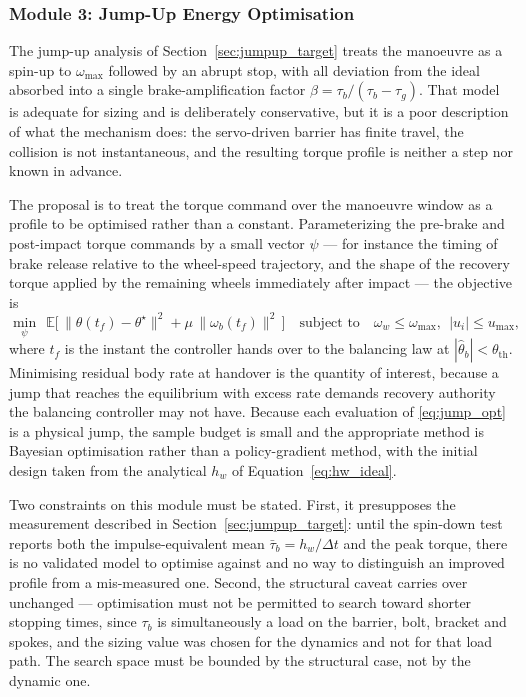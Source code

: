 \subsubsection{Module 3: Jump-Up Energy Optimisation}

The jump-up analysis of Section~\ref{sec:jumpup_target} treats the manoeuvre as
a spin-up to $\omega_{\max}$ followed by an abrupt stop, with all deviation
from the ideal absorbed into a single brake-amplification factor
$\beta = \tau_b/(\tau_b-\tau_g)$. That model is adequate for sizing and is
deliberately conservative, but it is a poor description of what the mechanism
does: the servo-driven barrier has finite travel, the collision is not
instantaneous, and the resulting torque profile is neither a step nor known in
advance.

The proposal is to treat the torque command over the manoeuvre window as a
profile to be optimised rather than a constant. Parameterizing the
pre-brake and post-impact torque commands by a small vector $\psi$ --- for
instance the timing of brake release relative to the wheel-speed trajectory,
and the shape of the recovery torque applied by the remaining wheels
immediately after impact --- the objective is
\begin{equation}
\min_{\psi}\ \ \mathbb{E}\Big[\, \|\theta(t_f) - \theta^\star\|^2 + \mu\,\|\omega_b(t_f)\|^2 \,\Big]
\quad \text{subject to} \quad
\omega_w \le \omega_{\max},\ \ |u_i| \le u_{\max},
\label{eq:jump_opt}
\end{equation}
where $t_f$ is the instant the controller hands over to the balancing law at
$|\hat\theta_b| < \theta_{\text{th}}$. Minimising residual body rate at
handover is the quantity of interest, because a jump that reaches the
equilibrium with excess rate demands recovery authority the balancing
controller may not have. Because each evaluation of \eqref{eq:jump_opt} is a
physical jump, the sample budget is small and the appropriate method is
Bayesian optimisation rather than a policy-gradient method, with the initial
design taken from the analytical $h_w$ of Equation~\eqref{eq:hw_ideal}.

Two constraints on this module must be stated. First, it presupposes the
measurement described in Section~\ref{sec:jumpup_target}: until the spin-down test
reports both the impulse-equivalent mean
$\bar\tau_b = h_w/\Delta t$ and the peak torque, there is no validated model to
optimise against and no way to distinguish an improved profile from a
mis-measured one. Second, the structural caveat carries over unchanged ---
optimisation must not be permitted to search toward shorter stopping times,
since $\tau_b$ is simultaneously a load on the barrier, bolt, bracket and
spokes, and the sizing value was chosen for the dynamics and not for that load
path. The search space must be bounded by the structural case, not by the
dynamic one.

